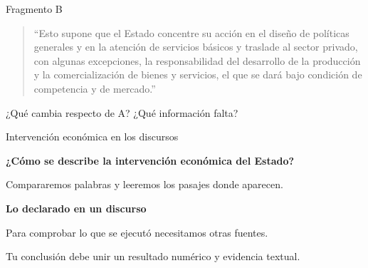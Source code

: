 \begin{frame}[label=fragmento-b]{Fragmento B}
  \begin{quote}
    \enquote{Esto supone que el Estado concentre su acción en el diseño de políticas generales y en la atención de servicios básicos y traslade al sector privado, con algunas excepciones, la responsabilidad del desarrollo de la producción y la comercialización de bienes y servicios, el que se dará bajo condición de competencia y de mercado.}
  \end{quote}
  ¿Qué cambia respecto de A? ¿Qué información falta?
\end{frame}

\begin{frame}[label=pregunta]{Intervención económica en los discursos}
  \relax
{\bfseries ¿Cómo se describe la intervención económica del Estado?\par}
  \par\vspace{0.45cm}
  Compararemos palabras y leeremos los pasajes donde aparecen.\par
  \par\vspace{0.4cm}
  \textbf{Lo declarado en un discurso}\par
  Para comprobar lo que se ejecutó necesitamos otras fuentes.\par
  \par\vspace{0.4cm}
  Tu conclusión debe unir un resultado numérico y evidencia textual.
\end{frame}

